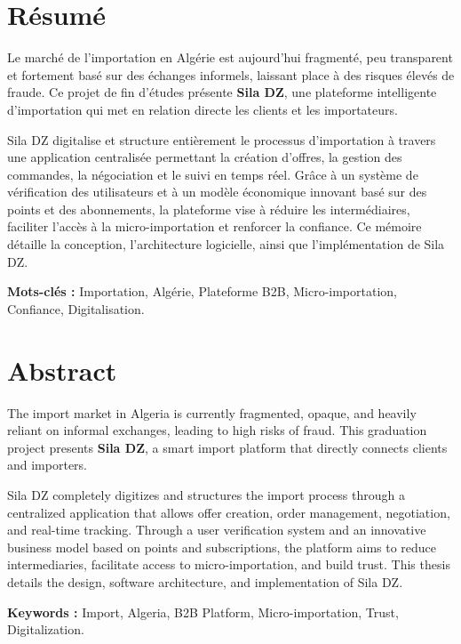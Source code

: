 \chapter*{Résumé}

Le marché de l'importation en Algérie est aujourd'hui fragmenté, peu transparent et fortement basé sur des échanges informels, laissant place à des risques élevés de fraude. Ce projet de fin d'études présente \textbf{Sila DZ}, une plateforme intelligente d'importation qui met en relation directe les clients et les importateurs. 

Sila DZ digitalise et structure entièrement le processus d'importation à travers une application centralisée permettant la création d'offres, la gestion des commandes, la négociation et le suivi en temps réel. Grâce à un système de vérification des utilisateurs et à un modèle économique innovant basé sur des points et des abonnements, la plateforme vise à réduire les intermédiaires, faciliter l'accès à la micro-importation et renforcer la confiance. Ce mémoire détaille la conception, l'architecture logicielle, ainsi que l'implémentation de Sila DZ.

\vspace{1cm}

\textbf{Mots-clés :} Importation, Algérie, Plateforme B2B, Micro-importation, Confiance, Digitalisation.

\newpage
\chapter*{Abstract}

The import market in Algeria is currently fragmented, opaque, and heavily reliant on informal exchanges, leading to high risks of fraud. This graduation project presents \textbf{Sila DZ}, a smart import platform that directly connects clients and importers. 

Sila DZ completely digitizes and structures the import process through a centralized application that allows offer creation, order management, negotiation, and real-time tracking. Through a user verification system and an innovative business model based on points and subscriptions, the platform aims to reduce intermediaries, facilitate access to micro-importation, and build trust. This thesis details the design, software architecture, and implementation of Sila DZ.

\vspace{1cm}

\textbf{Keywords :} Import, Algeria, B2B Platform, Micro-importation, Trust, Digitalization.
